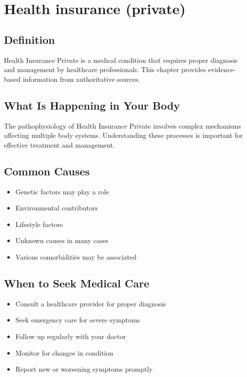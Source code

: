 
\chapter{Health insurance (private)}

\section*{Definition}
Health Insurance Private is a medical condition that requires proper diagnosis and management by healthcare professionals. This chapter provides evidence-based information from authoritative sources.

\section*{What Is Happening in Your Body}
The pathophysiology of Health Insurance Private involves complex mechanisms affecting multiple body systems. Understanding these processes is important for effective treatment and management.

\section*{Common Causes}
\begin{itemize}
  \item Genetic factors may play a role
  \item Environmental contributors
  \item Lifestyle factors
  \item Unknown causes in many cases
  \item Various comorbidities may be associated
\end{itemize}

\section*{When to Seek Medical Care}
\begin{itemize}
  \item Consult a healthcare provider for proper diagnosis
  \item Seek emergency care for severe symptoms
  \item Follow up regularly with your doctor
  \item Monitor for changes in condition
  \item Report new or worsening symptoms promptly
\end{itemize}

